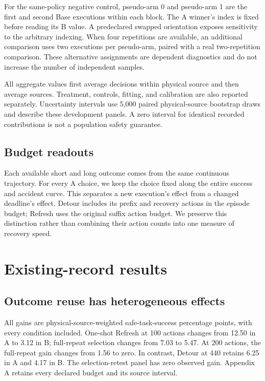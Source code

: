 For the same-policy negative control, pseudo-arm 0 and pseudo-arm 1 are the first and second Base executions within each block. The A winner's index is fixed before reading its B value. A predeclared swapped orientation exposes sensitivity to the arbitrary indexing. When four repetitions are available, an additional comparison uses two executions per pseudo-arm, paired with a real two-repetition comparison. These alternative assignments are dependent diagnostics and do not increase the number of independent samples.


All aggregate values first average decisions within physical source and then average sources. Treatment, controls, fitting, and calibration are also reported separately. Uncertainty intervals use 5,000 paired physical-source bootstrap draws and describe these development panels. A zero interval for identical recorded contributions is not a population safety guarantee.


\subsection{Budget readouts}

Each available short and long outcome comes from the same continuous trajectory. For every A choice, we keep the choice fixed along the entire success and accident curve. This separates a new execution's effect from a changed deadline's effect. Detour includes its prefix and recovery actions in the episode budget; Refresh uses the original suffix action budget. We preserve this distinction rather than combining their action counts into one measure of recovery speed.


\section{Existing-record results}

\subsection{Outcome reuse has heterogeneous effects}

All gains are physical-source-weighted safe-task-success percentage points, with every condition included. One-shot Refresh at 100 actions changes from 12.50 in A to 3.12 in B; full-repeat selection changes from 7.03 to 5.47. At 200 actions, the full-repeat gain changes from 1.56 to zero. In contrast, Detour at 440 retains 6.25 in A and 4.17 in B. The selection-retest panel has zero observed gain. Appendix A retains every declared budget and its source interval.


